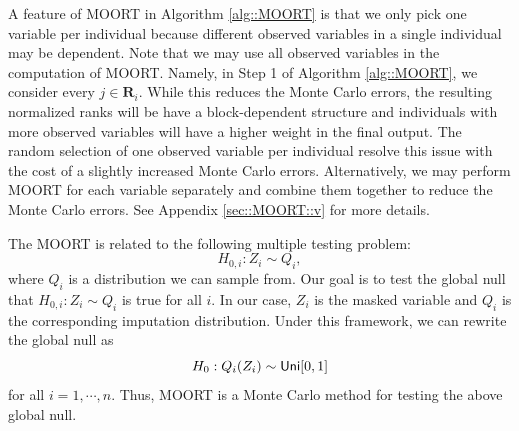 \documentclass[aos, preprint]{imsart}
\theoremstyle{plain}
\theoremstyle{definition}
\newtheorem{remark}[theorem]{Remark}
\let\tilde\widetilde
\newcommand{\R}{\mbox{$\mathbb{R}$}}
\newcommand{\bR}{\mathbf{R}}
\begin{document}
A feature of MOORT in Algorithm \ref{alg::MOORT} is that we only pick one variable per individual
because different observed variables in a single individual may  be dependent.
Note that we may use all observed variables in the computation of MOORT. Namely, in Step 1 of Algorithm \ref{alg::MOORT},
we consider every $j\in \bR_i$. 
While this reduces the Monte Carlo errors, the resulting normalized ranks will be have a block-dependent structure
and individuals with more observed variables will have a higher weight in the final output. 
The random selection of one observed variable per individual resolve this issue with  the cost of a slightly increased Monte Carlo errors. 
Alternatively, we may perform MOORT for each variable separately and combine them together
to reduce the Monte Carlo errors.
See Appendix \ref{sec::MOORT::v} for more details.



The MOORT is related to the following multiple testing problem:
$$
H_{0,i}: Z_i \sim Q_i,
$$
where $Q_i$ is a distribution we can sample from.
Our goal is to test the global null
that 
$H_{0,i}: Z_i \sim Q_i$ is true for all $i$.
In our case, $Z_i$ is the masked variable and $Q_i$ is the corresponding imputation distribution.
Under this framework, we can rewrite the global null as 
$$
H_0: Q_i(Z_i)\sim {\sf Uni}[0,1]
$$
for all $i=1,\cdots, n$.
Thus, MOORT is a Monte Carlo method for testing the above global null.


%
\end{document}
